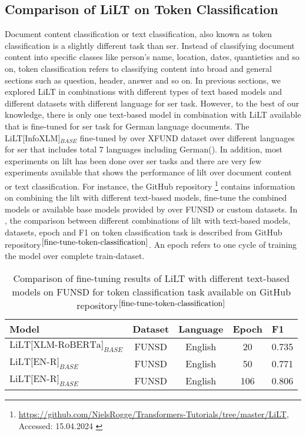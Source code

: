 \subsection{Comparison of LiLT on Token Classification}
Document content classification or text classification, also known as token classification is a slightly different task than \acrshort{ser}. Instead of classifying document content into specific classes like person's name, location, dates, quantieties and so on, token classification refers to classifying content into broad and general sections such as question, header, answer and so on. In previous sections, we explored LiLT in combinations with different types of text based models and different datasets with different language for \acrshort{ser} task. However,  to the best of our knowledge, there is only one text-based model in combination with LiLT available that is fine-tuned for \acrshort{ser} task for German language documents. The LiLT[InfoXLM]\(_{BASE}\) fine-tuned by \cite{wang-etal-2022-lilt} over XFUND dataset over different languages for \acrshort{ser} that includes total 7 languages including German(). In addition, most experiments on \acrshort{lilt} has been done over \acrshort{ser} tasks and there are very few experiments available that shows the performance of \acrshort{lilt} over document content or text classification. For instance, the GitHub repository \footnote{\url{https://github.com/NielsRogge/Transformers-Tutorials/tree/master/LiLT}, Accessed: 15.04.2024 \label{fine-tune-token-classification}} contains information on combining the \acrshort{lilt} with different text-based models, fine-tune the combined models or available base models provided by \cite{wang-etal-2022-lilt} over FUNSD or custom datasets. In , the comparison between different combinations of \acrshort{lilt} with text-based models, datasets, epoch and F1 on token classification task is described from GitHub repository\(^{\ref{fine-tune-token-classification}}\). An epoch refers to one cycle of training the model over complete train-dataset. 

\begin{table}[!ht]
    \centering
    \captionsetup{justification=centering}
    \begin{tabular}{lcccl}
    \toprule
    \textbf{Model}& \textbf{Dataset}& \textbf{Language} & \textbf{Epoch} &\textbf{F1}\\ \midrule
     \(\text{LiLT[XLM-RoBERTa]}_{BASE}\)& FUNSD & English & 20 & 0.735 \\
     \(\text{LiLT[EN-R]}_{BASE}\) & FUNSD & English & 50 & 0.771 \\
     \(\text{LiLT[EN-R]}_{BASE}\)& FUNSD & English & 106 & 0.806 \\ \bottomrule
    \end{tabular}
    \caption{Comparison of fine-tuning results of LiLT with different text-based models  on FUNSD for token classification task available on GitHub repository\(^{\ref{fine-tune-token-classification}}\) }
    \label{tab:Compare_FUNSD_token_classification}
\end{table}


